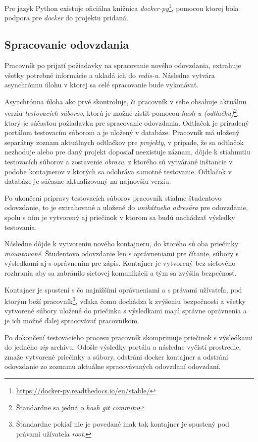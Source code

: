 \documentclass[
  digital, %
  twoside, %
  table,   %
  lof,     %
  lot,     %
]{fithesis3}
\begin{document}
Pre jazyk Python existuje oficiálna knižnica \emph{docker-py}\footnote{\url{https://docker-py.readthedocs.io/en/stable/}}, pomocou ktorej bola podpora pre \emph{docker} do projektu pridaná.


\subsection{Spracovanie odovzdania}

Pracovník po prijatí požiadavky na spracovanie nového odovzdania, extrahuje všetky potrebné informácie a ukladá ich do \emph{redis-u}. Následne vytvára asynchrónnu úlohu v ktorej sa celé spracovanie bude vykonávať.

Asynchrónna úloha ako prvé skontroluje, či pracovník v sebe obsahuje aktuálnu verziu \emph{testovacích súborov}, ktorú je možné zistiť pomocou \emph{hash-u (odtlačku)}\footnote{Štandardne sa jedná o \emph{hash git commitu}}, ktorý je súčasťou požiadavku pre spracovanie odovzdania. Odtlačok je priradený portálom testovacím súborom a je uložený v databáze. Pracovník má uložený separátny zoznam aktuálnych odtlačkov pre \emph{projekty}, v prípade, že sa odtlačok nezhoduje alebo pre daný projekt doposiaľ neexistuje záznam, dôjde k stiahnutiu testovacích súborov a zostavenie \emph{obrazu}, z ktorého sú vytvárané inštancie v podobe kontajnerov v ktorých sa odohráva samotné testovanie. Odtlačok v databáze je súčasne aktualizovaný na najnovšiu verziu.

Po ukončení prípravy testovacích súborov pracovník stiahne študentovo odovzdanie, to je extrahované a uložené do \emph{unikátneho adresára} pre odovzdanie, spolu s ním je vytvorený aj priečinok v ktorom sa budú nachádzať výsledky testovania. 

Následne dôjde k vytvoreniu nového kontajneru, do ktorého sú oba priečinky \emph{mountované}. Študentovo odovzdanie len s oprávneniami pre čítanie, súbory s výsledkami aj s oprávnením pre zápis. Kontajner je vytvorený bez sieťového rozhrania aby sa zabránilo sieťovej komunikácii a tým sa zvýšila bezpečnosť.

Kontajner je spustení s čo najnižšími oprávneniami a s  právami užívateľa, pod ktorým beží pracovník\footnote{Štandardne pokiaľ nie je povedané inak tak kontajner je spustený pod právami užívateľa \emph{root}.}, vďaka čomu dochádza k zvýšeniu bezpečnosti a všetky vytvorené súbory uložené do priečinka s výsledkami majú správne oprávnenia a je ich možné ďalej spracovávať pracovníkom.

Po dokončení testovacieho procesu pracovník skomprimuje priečinok s výsledkami do jedného \emph{zip} archívu. Odošle výsledky portálu a následne vyčistí prostredie, zmaže vytvorené priečinky a súbory, odstráni docker kontajner a odstráni odovzdanie zo zoznamu aktuálne spracovávaných odovzdaní odovzdaní.
\end{document}
